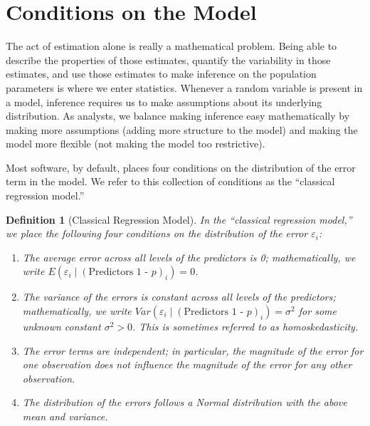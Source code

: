\documentclass[
]{book}
\providecommand{\tightlist}{%
  \setlength{\itemsep}{0pt}\setlength{\parskip}{0pt}}
\theoremstyle{plain}
\theoremstyle{mydefn}
\newtheorem{definition}{Definition}[chapter]
\theoremstyle{myexmpl}
\theoremstyle{remark}
\begin{document}
\hypertarget{conditions-on-the-model}{%
\section{Conditions on the Model}\label{conditions-on-the-model}}

The act of estimation alone is really a mathematical problem. Being able to describe the properties of those estimates, quantify the variability in those estimates, and use those estimates to make inference on the population parameters is where we enter statistics. Whenever a random variable is present in a model, inference requires us to make assumptions about its underlying distribution. As analysts, we balance making inference easy mathematically by making more assumptions (adding more structure to the model) and making the model more flexible (not making the model too restrictive).

Most software, by default, places four conditions on the distribution of the error term in the model. We refer to this collection of conditions as the ``classical regression model.''

\begin{definition}[Classical Regression Model]

In the ``classical regression model,'' we place the following four conditions on the distribution of the error \(\varepsilon_i\):

\begin{enumerate}
\def\labelenumi{\arabic{enumi}.}
\tightlist
\item
  The average error across all levels of the predictors is 0; mathematically, we write \(E\left(\varepsilon_i \mid (\text{Predictors 1 - }p)_i\right) = 0\).
\item
  The variance of the errors is constant across all levels of the predictors; mathematically, we write \(Var\left(\varepsilon_i \mid (\text{Predictors 1 - }p)_i\right) = \sigma^2\) for some unknown constant \(\sigma^2 > 0\). This is sometimes referred to as homoskedasticity.
\item
  The error terms are independent; in particular, the magnitude of the error for one observation does not influence the magnitude of the error for any other observation.
\item
  The distribution of the errors follows a Normal distribution with the above mean and variance.
\end{enumerate}

\end{definition}
\end{document}
